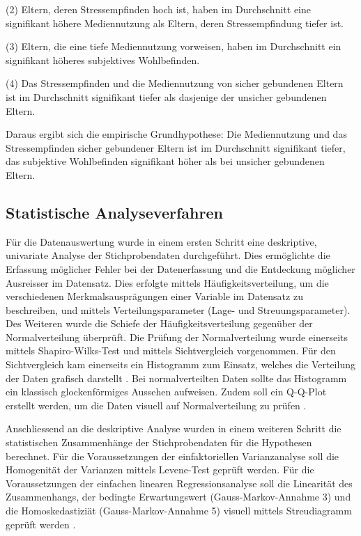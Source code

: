 (2) Eltern, deren Stressempfinden hoch ist, haben im Durchschnitt eine signifikant höhere Mediennutzung als Eltern, deren Stressempfindung tiefer ist.

(3) Eltern, die eine tiefe Mediennutzung vorweisen, haben im Durchschnitt ein signifikant höheres subjektives Wohlbefinden.

(4) Das Stressempfinden und die Mediennutzung von sicher gebundenen Eltern ist im Durchschnitt signifikant tiefer als dasjenige der unsicher gebundenen Eltern.

Daraus ergibt sich die empirische Grundhypothese: Die Mediennutzung und das Stressempfinden sicher gebundener Eltern ist im Durchschnitt signifikant tiefer, das subjektive Wohlbefinden signifikant höher als bei unsicher gebundenen Eltern.


\subsection{Statistische Analyseverfahren}
Für die Datenauswertung wurde in einem ersten Schritt eine deskriptive, univariate Analyse der Stichprobendaten durchgeführt. Dies ermöglichte die Erfassung möglicher Fehler bei der Datenerfassung und die Entdeckung möglicher Ausreisser im Datensatz. Dies erfolgte mittels Häufigkeitsverteilung, um die verschiedenen Merkmalsausprägungen einer Variable im Datensatz zu beschreiben, und mittels Verteilungsparameter (Lage- und Streuungsparameter). Des Weiteren wurde die Schiefe der Häufigkeitsverteilung gegenüber der Normalverteilung überprüft. Die Prüfung der Normalverteilung wurde einerseits mittels Shapiro-Wilks-Test \cite{Shapiro1965} und mittels Sichtvergleich vorgenommen. Für den Sichtvergleich kam einerseits ein Histogramm zum Einsatz, welches die Verteilung der Daten grafisch darstellt \cite{Hemmerich2018}. Bei normalverteilten Daten sollte das Histogramm ein klassisch glockenförmiges Aussehen aufweisen. Zudem soll ein Q-Q-Plot erstellt werden, um die Daten visuell auf Normalverteilung zu prüfen \cite{Hemmerich2018}. 

Anschliessend an die deskriptive Analyse wurden in einem weiteren Schritt die statistischen Zusammenhänge der Stichprobendaten für die Hypothesen berechnet. Für die Voraussetzungen der einfaktoriellen Varianzanalyse soll die Homogenität der Varianzen mittels Levene-Test geprüft werden. Für die Voraussetzungen der einfachen linearen Regressionsanalyse soll die Linearität des Zusammenhangs, der bedingte Erwartungswert (Gauss-Markov-Annahme 3) und die Homoskedastiziät (Gauss-Markov-Annahme 5) visuell mittels Streudiagramm geprüft werden \cite{UniversitatZurich2018}.

